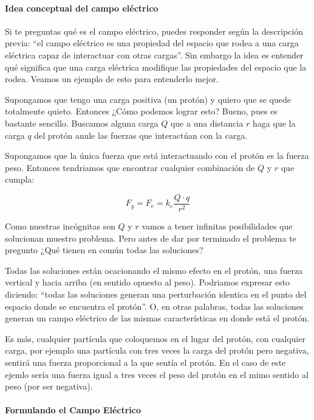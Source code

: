 \paragraph{Idea conceptual del campo eléctrico}

Si te preguntas qué es el campo eléctrico, puedes responder según la descripción previa: ``el campo eléctrico es una propiedad del espacio que rodea a una carga eléctrica capaz de interactuar con otras cargas''. Sin embargo la idea es entender qué significa que una carga eléctrica modifique las propiedades del espacio que la rodea. Veamos un ejemplo de esto para entenderlo mejor.

Supongamos que tengo una carga positiva (un protón) y quiero que se quede totalmente quieto. Entonces ¿Cómo podemos lograr esto? 
Bueno, pues es bastante sencillo. Buscamos alguna carga \( Q \) que a una distancia \( r \) haga que la carga \( q \) del protón anule las fuerzas que interactúan con la carga.

Supongamos que la única fuerza que está interactuando con el protón es la fuerza peso. Entonces tendriamos que encontrar cualquier combinación de \( Q \) y \( r \) que cumpla:

\[
    F_g = F_e = k_e \frac{Q \cdot q}{r^2}
\]

Como nuestras incógnitas son \( Q \) y \( r \) vamos a tener infinitas posibilidades que solucionan muestro problema. Pero antes de dar por terminado el problema te pregunto ¿Qué tienen en común todas las soluciones?

Todas las soluciones están ocacionando el mismo efecto en el protón, una fuerza vertical y hacia arriba (en sentido opuesto al peso). Podriamos expresar esto diciendo: ``todas las soluciones generan una perturbación identica en el punto del espacio donde se encuentra el protón''. O, en otras palabras, todas las soluciones generan un campo eléctrico de las mismas características en donde está el protón.

Es más, cualquier partícula que coloquemos en el lugar del protón, con cualquier carga, por ejemplo una partícula con tres veces la carga del protón pero negativa, sentirá una fuerza proporcional a la que sentía el protón. En el caso de este ejemlo sería una fuerza igual a tres veces el peso del protón en el mimo sentido al peso (por ser negativa).

\paragraph{Formulando el Campo Eléctrico}

